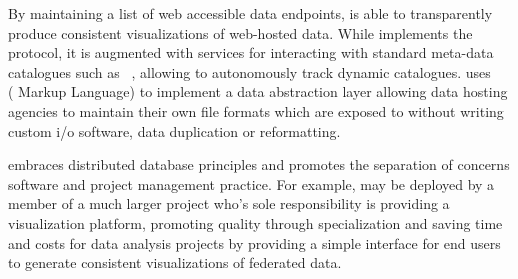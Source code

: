 By maintaining a list of web accessible data endpoints, \sciwms{} is
able to transparently produce consistent visualizations of web-hosted
data. While \sciwms{} implements the \ogc{} \wms{}~\cite{wms14}
protocol, it is augmented with services for interacting with standard
meta-data catalogues such as \csw{}~\cite{csw14}, allowing \sciwms{}
to autonomously track dynamic catalogues. \sciwms{} uses
\ncml{}~\cite{ncml06} (\netcdf{} Markup Language) to implement a data
abstraction layer allowing data hosting agencies to maintain their own
file formats which are exposed to \sciwms{} without writing custom i/o
software, data duplication or reformatting.

\sciwms{} embraces distributed database principles and promotes the
separation of concerns software and project management practice. For
example, \sciwms{} may be deployed by a member of a much larger
project who's sole responsibility is providing a visualization
platform, promoting quality through specialization and saving time and
costs for data analysis projects by providing a simple interface for
end users to generate consistent visualizations of federated data.
